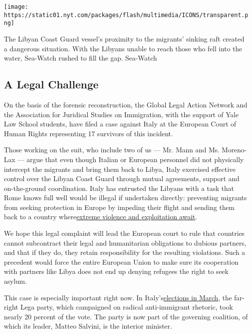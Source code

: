 \texttt{[image: https://static01.nyt.com/packages/flash/multimedia/ICONS/transparent.png]}

The Libyan Coast Guard vessel's proximity to the migrants' sinking raft
created a dangerous situation. With the Libyans unable to reach those
who fell into the water, Sea-Watch rushed to fill the gap. Sea-Watch

\hypertarget{a-legal-challenge}{%
\subsection{A Legal Challenge}\label{a-legal-challenge}}

On the basis of the forensic reconstruction, the Global Legal Action
Network and the Association for Juridical Studies on Immigration, with
the support of Yale Law School students, have filed a case against Italy
at the European Court of Human Rights representing 17 survivors of this
incident.

Those working on the suit, who include two of us --- Mr. Mann and Ms.
Moreno-Lax --- argue that even though Italian or European personnel did
not physically intercept the migrants and bring them back to Libya,
Italy exercised effective control over the Libyan Coast Guard through
mutual agreements, support and on-the-ground coordination. Italy has
entrusted the Libyans with a task that Rome knows full well would be
illegal if undertaken directly: preventing migrants from seeking
protection in Europe by impeding their flight and sending them back to a
country
where\href{https://www.amnesty.org/download/Documents/EUR3089062018ENGLISH.pdf}{}\href{https://www.amnesty.org/download/Documents/EUR3089062018ENGLISH.pdf}{extreme
violence and exploitation await}.

We hope this legal complaint will lead the European court to rule that
countries cannot subcontract their legal and humanitarian obligations to
dubious partners, and that if they do, they retain responsibility for
the resulting violations. Such a precedent would force the entire
European Union to make sure its cooperation with partners like Libya
does not end up denying refugees the right to seek asylum.

This case is especially important right now. In
Italy's\href{https://www.nytimes.com/2018/03/04/world/europe/italy-election.html}{}\href{https://www.nytimes.com/2018/03/04/world/europe/italy-election.html}{elections
in March}, the far-right Lega party, which campaigned on radical
anti-immigrant rhetoric, took nearly 20 percent of the vote. The party
is now part of the governing coalition, of which its leader, Matteo
Salvini, is the interior minister.

